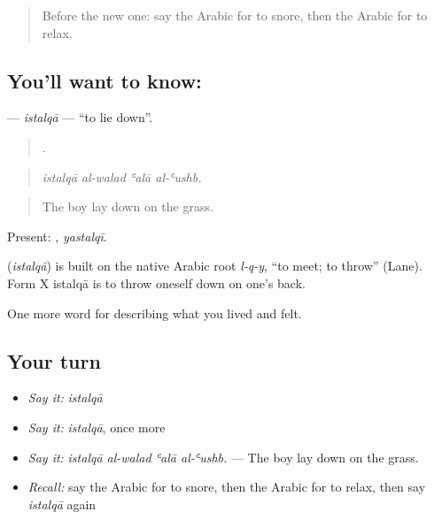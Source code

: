 \label{lesson:AR-C515-istalqa}



\begin{quote}
Before the new one: say the Arabic for to snore, then the Arabic for to relax.
\end{quote}

\subsection*{You'll want to know: }
\textbf{} — \emph{istalqā} — \textquotedblleft{}to lie down\textquotedblright{}.

\begin{quote}
   .
\end{quote}

\begin{quote}
\emph{istalqā al-walad ʿalā al-ʿushb.}
\end{quote}

\begin{quote}
The boy lay down on the grass.
\end{quote}

Present: , \emph{yastalqī}.

\begin{cousinweb}
\textbf{} (\emph{istalqā}) is built on the native Arabic root \emph{l-q-y}, \textquotedblleft{}to meet; to throw\textquotedblright{} (Lane). Form X istalqā is to throw oneself down on one's back.
\end{cousinweb}

\begin{grammarlens}[title={What you've built}]
One more word for describing what you lived and felt.
\end{grammarlens}

\subsection*{Your turn}
\begin{itemize}
\raggedright
  \item \emph{Say it:} \emph{istalqā}
  \item \emph{Say it:} \emph{istalqā}, once more
  \item \emph{Say it:} \emph{istalqā al-walad ʿalā al-ʿushb.} — The boy lay down on the grass.
  \item \emph{Recall:} say the Arabic for to snore, then the Arabic for to relax, then say \emph{istalqā} again
\end{itemize}

